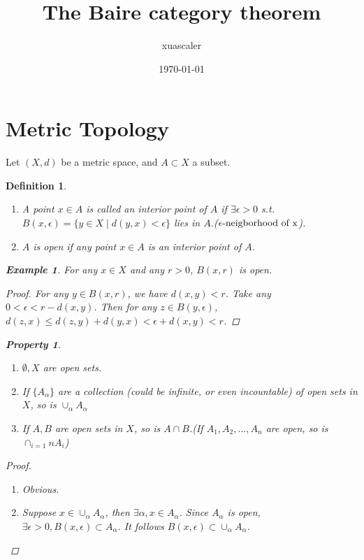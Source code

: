 \documentclass{article}
\title{The Baire category theorem}
\author{xuascaler}
\date{\today}
\newtheorem*{property}{Property}
\newtheorem*{definition}{Definition}
\newtheorem*{example}{Example}
\begin{document}
\maketitle

\section*{Metric Topology}
Let $(X, d)$ be a metric space, and $A \subset X$ a subset.
\begin{definition} \hfill
    \begin{enumerate}
        \item A point $x \in A$ is called an interior point of $A$ if $\exists \epsilon > 0$ s.t.
        $B(x, \epsilon) = \{y \in X \mid d(y, x) < \epsilon\}$ lies in $A$.($\epsilon \textnormal{-neigborhood of x}$).
        \item $A$ is open if any point $x \in A$ is an interior point of $A$.
    \end{enumerate}
    \begin{example}
        For any $x \in X$ and any $r > 0$, $B(x, r)$ is open.
        \begin{proof}
            For any $y \in B(x, r)$, we have $d(x, y) < r$. Take any $0 < \epsilon < r - d(x, y)$.
            Then for any $z \in B(y, \epsilon)$,
            $d(z, x) \le d(z, y) + d(y, x) < \epsilon + d(x, y) < r$.
        \end{proof}
    \end{example}
    \begin{property} \hfill
        \begin{enumerate} 
            \item $\emptyset, X$ are open sets.
            \item If $\{A_\alpha\}$ are a collection (could be infinite, or even incountable) of open sets in $X$,
            so is $\cup_\alpha A_\alpha$
            \item If $A, B$ are open sets in $X$, so is $A \cap B$.(If $A_1, A_2, ..., A_n$ are open, so is $\cap_{i=1}{n}A_i$)
        \end{enumerate}
        \begin{proof} \hfill
            \begin{enumerate}
                \item Obvious.
                \item Suppose $x \in \cup_\alpha A_\alpha$, then $\exists \alpha, x \in A_\alpha$. Since $A_\alpha$ is open,
                $\exists \epsilon > 0, B(x, \epsilon) \subset A_\alpha$. It follows $B(x, \epsilon) \subset \cup_\alpha A_\alpha$.

\end{enumerate}
\end{proof}
\end{property}
\end{definition}
\end{document}
